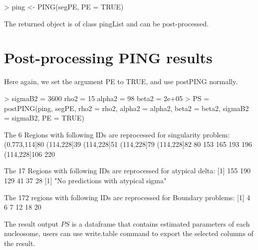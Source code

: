 \documentclass[11pt]{article}
\begin{document}
\begin{Schunk}
\begin{Sinput}
> ping <- PING(segPE, PE = TRUE)
\end{Sinput}
\end{Schunk}
The returned object is of class pingList and can be post-processed.


\section{Post-processing PING results}
Here again, we set the argument PE to TRUE, and use postPING normally.

\begin{Schunk}
\begin{Sinput}
> {
     sigmaB2 = 3600
     rho2 = 15
     alpha2 = 98
     beta2 = 2e+05
 }
> PS = postPING(ping, segPE, rho2 = rho2, alpha2 = alpha2, beta2 = beta2, 
     sigmaB2 = sigmaB2, PE = TRUE)
\end{Sinput}
\begin{Soutput}
 The 6 Regions with following IDs are reprocessed for singularity problem: 
(0.773,114]80   (114,228]39   (114,228]51   (114,228]79   (114,228]82 
           80           153           165           193           196 
 (114,228]106 
          220 

 The 17 Regions with following IDs are reprocessed for atypical delta: 
[1] 155 190 129  41  37  28
[1] "No predictions with atypical sigma"

 The 172 regions with following IDs are reprocessed for Boundary problems: 
[1]  4  6  7 12 18 20
\end{Soutput}
\end{Schunk}
The result output $PS$ is a dataframe that contains estimated parameters of each nucleosome, users can use write.table command to export the selected columns of the result.
\end{document}
